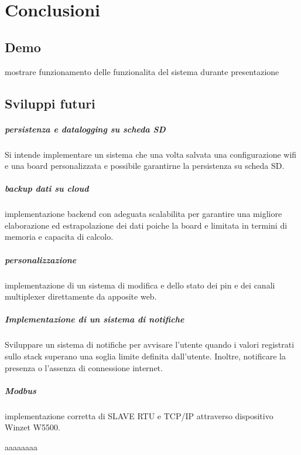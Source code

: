 \documentclass[12pt,a4paper]{report}
\begin{document}
\chapter{Conclusioni}
\section{Demo}
mostrare funzionamento delle funzionalita del sistema durante presentazione
\section{Sviluppi futuri}
\paragraph{persistenza e datalogging su scheda SD}
Si intende implementare un sistema che una volta salvata una configurazione wifi  e una board personalizzata e possibile garantirne la persistenza su scheda SD.

\paragraph{backup dati su cloud} implementazione backend con adeguata scalabilita
per garantire una migliore elaborazione ed estrapolazione dei dati poiche la board e limitata in termini di memoria e capacita di calcolo.

\paragraph{personalizzazione}
implementazione di un sistema di modifica e  dello stato dei pin e dei canali multiplexer direttamente da apposite web.

\paragraph{Implementazione di un sistema di notifiche}
Sviluppare un sistema di notifiche per avvisare l'utente quando i valori registrati sullo stack superano una soglia limite definita dall'utente. Inoltre, notificare la presenza o l'assenza di connessione internet.

\paragraph{Modbus}
implementazione corretta di SLAVE RTU e TCP/IP attraverso dispositivo Winzet W5500.

aaaaaaaa
\end{document}
